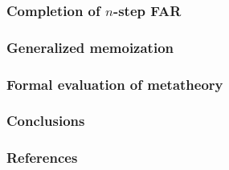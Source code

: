 \documentclass{beamer}
\begin{document}
\begin{frame}
  \frametitle{Completion of $n$-step FAR}
\end{frame}

\begin{frame}
  \frametitle{Generalized memoization}
\end{frame}

\begin{frame}
  \frametitle{Formal evaluation of metatheory}
\end{frame}

\begin{frame}
  \frametitle{Conclusions}
\end{frame}

\begin{frame}
  \frametitle{References}

\end{frame}
\end{document}
